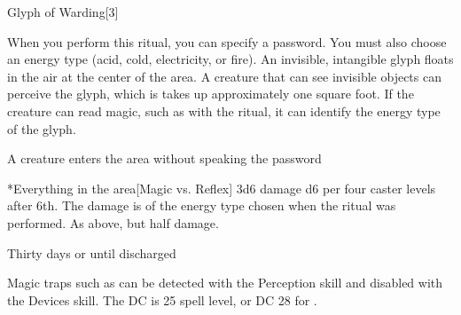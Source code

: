 \begin{spellsection}{Glyph of Warding}[3]
    \begin{spellheader}
    \end{spellheader}
    \begin{spellcontent}
        \begin{spelltargetinginfo}
        \end{spelltargetinginfo}
        \begin{spelleffects}

            \spellspecial When you perform this ritual, you can specify a password. You must also choose an energy type (acid, cold, electricity, or fire).
            \spellline
            \spelleffect An invisible, intangible glyph floats in the air at the center of the area. A creature that can see invisible objects can perceive the glyph, which is takes up approximately one square foot. If the creature can read magic, such as with the  ritual, it can identify the energy type of the glyph.
            \begin{spelltrigger}{A creature enters the area without speaking the password}
                \begin{spelltargets}*{Everything in the area}[Magic vs. Reflex]
                    \spellsuccess 3d6 damage \add d6 per four caster levels after 6th. The damage is of the energy type chosen when the ritual was performed.
                    \spellfailure As above, but half damage.
                \end{spelltargets}
            \end{spelltrigger}
            \spelldur Thirty days or until discharged
        \end{spelleffects}
    \end{spellcontent}
    \begin{spellfooter}
        \spellnotes Magic traps such as  can be detected with the Perception skill and disabled with the Devices skill. The DC is 25 \add spell level, or DC 28 for .
    \end{spellfooter}
\end{spellsection}

